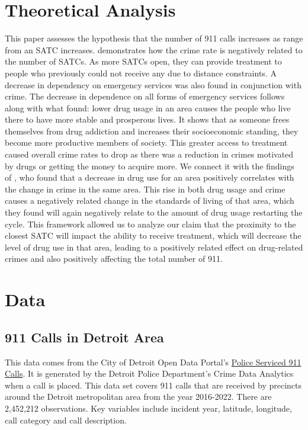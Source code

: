 \documentclass[12pt]{article}
\begin{document}
\section{Theoretical Analysis}
\label{sec:theory}
This paper assesses the hypothesis that the number of 911 calls increases as range from an SATC increases. \cite{SAT_centers_and_crime} demonstrates how the crime rate is negatively related to the number of SATCs. As more SATCs open, they can provide treatment to people who previously could not receive any due to distance constraints. A decrease in dependency on emergency services was also found in conjunction with crime. The decrease in dependence on all forms of emergency services follows along with what \cite{Socioeconomic-Determinants} found: lower drug usage in an area causes the people who live there to have more stable and prosperous lives. It shows that as someone frees themselves from drug addiction and increases their socioeconomic standing, they become more productive members of society. This greater access to treatment caused overall crime rates to drop as there was a reduction in crimes motivated by drugs or getting the money to acquire more. We connect it with the findings of \cite{drugs_and_crime}, who found that a decrease in drug use for an area positively correlates with the change in crime in the same area. This rise in both drug usage and crime causes a negatively related change in the standards of living of that area, which they found will again negatively relate to the amount of drug usage restarting the cycle. This framework allowed us to analyze our claim that the proximity to the closest SATC will impact the ability to receive treatment, which will decrease the level of drug use in that area, leading to a positively related effect on drug-related crimes and also positively affecting the total number of 911.



\section{Data}
\label{sec:data}

\subsection{911 Calls in Detroit Area}

This data comes from the City of Detroit Open Data Portal's   \href{https://data.detroitmi.gov/datasets/detroitmi::police-serviced-911-calls/about}{Police Serviced 911 Calls}. It is generated by the Detroit Police Department's Crime Data Analytics when a call is placed. This data set covers 911 calls that are received by precincts around the Detroit metropolitan area from the year 2016-2022. There are 2,452,212 observations. Key variables include incident year, latitude, longitude, call category and call description. 
\end{document}
